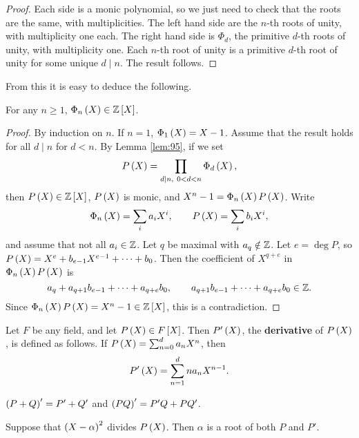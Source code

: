 \begin{proof}
Each side is a monic polynomial, so we just need to check that the roots are the same, with multiplicities. The left hand side are the $ n $-th roots of unity, with multiplicity one each. The right hand side is $ \Phi_d $, the primitive $ d $-th roots of unity, with multiplicity one. Each $ n $-th root of unity is a primitive $ d $-th root of unity for some unique $ d \mid n $. The result follows.
\end{proof}

From this it is easy to deduce the following.

\begin{lemma}
For any $ n \ge 1 $, $ \Phi_n\br{X} \in \ZZ\sbr{X} $.
\end{lemma}

\begin{proof}
By induction on $ n $. If $ n = 1 $, $ \Phi_1\br{X} = X - 1 $. Assume that the result holds for all $ d \mid n $ for $ d < n $. By Lemma \ref{lem:95}, if we set
$$ P\br{X} = \prod_{d \mid n, \ 0 < d < n} \Phi_d\br{X}, $$
then $ P\br{X} \in \ZZ\sbr{X} $, $ P\br{X} $ is monic, and $ X^n - 1 = \Phi_n\br{X}P\br{X} $. Write
$$ \Phi_n\br{X} = \sum_i a_iX^i, \qquad P\br{X} = \sum_i b_iX^i, $$
and assume that not all $ a_i \in \mathbb{Z} $. Let $ q $ be maximal with $ a_q \notin \mathbb{Z} $. Let $ e = \deg P $, so $ P\br{X} = X^e + b_{e - 1}X^{e - 1} + \dots + b_0 $. Then the coefficient of $ X^{q + e} $ in $ \Phi_n\br{X}P\br{X} $ is
$$ a_q + a_{q + 1}b_{e - 1} + \dots + a_{q + e}b_0, \qquad a_{q + 1}b_{e - 1} + \dots + a_{q + e}b_0 \in \mathbb{Z}. $$
Since $ \Phi_n\br{X}P\br{X} = X^n - 1 \in \ZZ\sbr{X} $, this is a contradiction.
\end{proof}

\pagebreak

\begin{definition}
Let $ F $ be any field, and let $ P\br{X} \in F\sbr{X} $. Then $ P'\br{X} $, the \textbf{derivative} of $ P\br{X} $, is defined as follows. If $ P\br{X} = \sum_{n = 0}^d a_nX^n $, then
$$ P'\br{X} = \sum_{n = 1}^d na_nX^{n - 1}. $$
\end{definition}

\begin{note*}
$ \br{P + Q}' = P' + Q' $ and $ \br{PQ}' = P'Q + PQ' $.
\end{note*}

\begin{lemma}
\label{lem:98}
Suppose that $ \br{X - \alpha}^2 $ divides $ P\br{X} $. Then $ \alpha $ is a root of both $ P $ and $ P' $.
\end{lemma}

